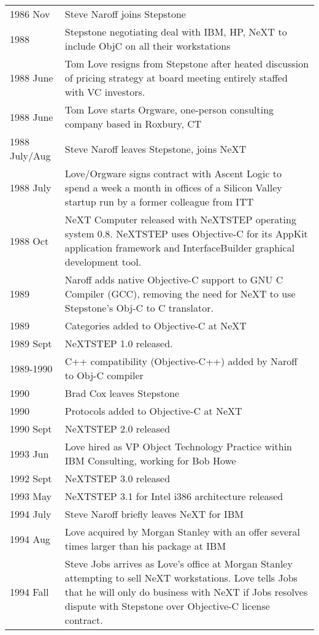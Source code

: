 \documentclass[acmsmall]{acmart}\settopmatter{}
\begin{document}
\begin{longtable}{lp{4.40in}}
1986 Nov	& Steve Naroff joins Stepstone \\
1988 	& Stepstone negotiating deal with IBM, HP, NeXT to include ObjC on all their workstations \\
1988 June	& Tom Love resigns from Stepstone after heated discussion of pricing strategy at board meeting entirely staffed with VC investors. \\
1988 June	& Tom Love starts Orgware, one-person consulting company based in Roxbury, CT \\
1988 July/Aug	& Steve Naroff leaves Stepstone, joins NeXT \\
1988 July	& Love/Orgware signs contract with Ascent Logic to spend a week a month in offices of a Silicon Valley startup run by a former colleague from ITT \\
1988 Oct	& NeXT Computer released with NeXTSTEP operating system 0.8. NeXTSTEP uses Objective-C for its AppKit application framework and InterfaceBuilder graphical development tool. \\
1989	& Naroff adds native Objective-C support to GNU C Compiler (GCC), removing the need for NeXT to use Stepstone's Obj-C to C translator. \\
1989	& Categories added to Objective-C at NeXT \\
1989 Sept	& NeXTSTEP 1.0 released. \\
1989-1990	& C++ compatibility (Objective-C++) added by Naroff to Obj-C compiler \\
1990 	& Brad Cox leaves Stepstone \\
1990 	& Protocols added to Objective-C at NeXT \\
1990 Sept	& NeXTSTEP 2.0 released \\
1993 Jun	& Love hired as VP Object Technology Practice within IBM Consulting, working for Bob Howe \\
1992 Sept	& NeXTSTEP 3.0 released \\
1993 May	& NeXTSTEP 3.1 for Intel i386 architecture released \\
1994 July	& Steve Naroff briefly leaves NeXT for IBM \\
1994 Aug	& Love acquired by Morgan Stanley with an offer several times larger than his package at IBM \\
1994 Fall	& Steve Jobs arrives as Love's office at Morgan Stanley attempting to sell NeXT workstations. Love tells Jobs that he will only do business with NeXT if Jobs resolves dispute with Stepstone over Objective-C license contract. \\

\end{longtable}
\end{document}
